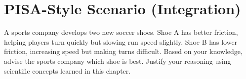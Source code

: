 \documentclass[justified]{tufte-book}
\begin{document}
\section*{PISA-Style Scenario (Integration)}
A sports company develops two new soccer shoes. Shoe A has better friction, helping players turn quickly but slowing run speed slightly. Shoe B has lower friction, increasing speed but making turns difficult. Based on your knowledge, advise the sports company which shoe is best. Justify your reasoning using scientific concepts learned in this chapter.
\end{document}

